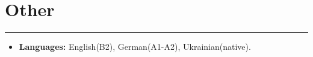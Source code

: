 {
    \section*{Other}
    \par\noindent\rule{\textwidth}{0.1mm}

    \begin{itemize}
        \item \textbf{Languages:} English(B2), German(A1-A2), Ukrainian(native).
    \end{itemize}
}
